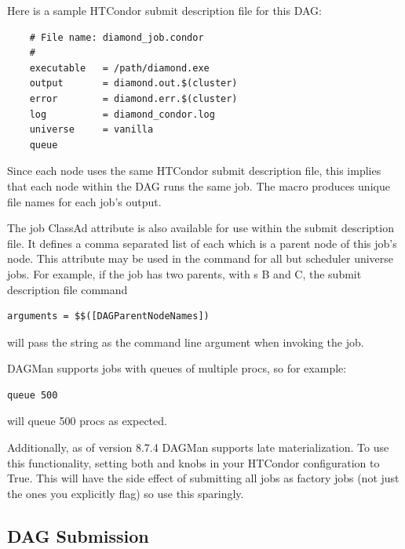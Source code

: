 Here is a sample HTCondor submit description file
for this DAG:

\begin{verbatim}
    # File name: diamond_job.condor
    #
    executable   = /path/diamond.exe
    output       = diamond.out.$(cluster)
    error        = diamond.err.$(cluster)
    log          = diamond_condor.log
    universe     = vanilla
    queue
\end{verbatim}

Since each node uses the same HTCondor submit description file,
this implies that each node within the DAG runs the
same job.
The  macro
produces unique file names for each job's output.

The job ClassAd attribute  is also available
for use within the submit description file. 
It defines a comma separated list of each 
which is a parent node of this job's node.
This attribute may be used in the  command
for all but scheduler universe jobs.
For example, if the job has two parents, with s B and C,
the submit description file command
\begin{verbatim}
arguments = $$([DAGParentNodeNames])
\end{verbatim}
will pass the string  as the command line argument when invoking
the job.

DAGMan supports jobs with queues of multiple procs, so for example:
\begin{verbatim}
queue 500
\end{verbatim}
will queue 500 procs as expected. 

Additionally, as of version 8.7.4 DAGMan supports late materialization. To use
this functionality, setting both  
and  knobs in your HTCondor
configuration to True. This will have the side effect of submitting all jobs as
factory jobs (not just the ones you explicitly flag) so use this sparingly.

\subsection{\label{dagman:submitdag}DAG Submission}

